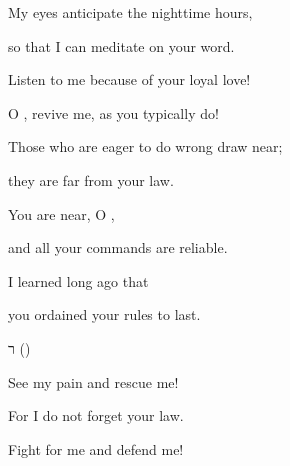 {\par }{\Q {}My
eyes
anticipate
the nighttime
hours,
\par }{\Q so that I can meditate on
your word.
\par }{\Q {}Listen
to me because of your loyal love!
\par }{\Q O
{}, revive
me, as you typically do!
\par }{\Q {}Those who
are eager
to do wrong draw near;
\par }{\Q they are far
from your law.
\par }{\Q {}You are near,
O
{},
\par }{\Q and all
your commands
are reliable.
\par }{\Q {}I learned
long ago
that
\par }{\Q you ordained
your rules
to last.
\par }{\SH ר ({})
\par }{\Q {}See my pain and rescue me!
\par }{\Q For I do not forget your law.
\par }{\Q {}Fight
for me and defend
me!

}
